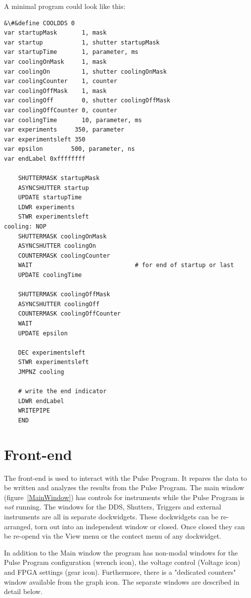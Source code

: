 \documentclass[11pt]{scrartcl}
\begin{document}
A minimal program could look like this:
\begin{lstlisting}
&\#&define COOLDDS 0
var startupMask       1, mask
var startup           1, shutter startupMask
var startupTime       1, parameter, ms
var coolingOnMask     1, mask
var coolingOn         1, shutter coolingOnMask
var coolingCounter    1, counter
var coolingOffMask    1, mask
var coolingOff        0, shutter coolingOffMask
var coolingOffCounter 0, counter
var coolingTime       10, parameter, ms
var experiments     350, parameter
var experimentsleft 350
var epsilon        500, parameter, ns
var endLabel 0xffffffff

	SHUTTERMASK startupMask
	ASYNCSHUTTER startup
	UPDATE startupTime
	LDWR experiments
	STWR experimentsleft
cooling: NOP
	SHUTTERMASK coolingOnMask
	ASYNCSHUTTER coolingOn
	COUNTERMASK coolingCounter
	WAIT                             # for end of startup or last
	UPDATE coolingTime

	SHUTTERMASK coolingOffMask
	ASYNCSHUTTER coolingOff
	COUNTERMASK coolingOffCounter
	WAIT
	UPDATE epsilon

	DEC experimentsleft
	STWR experimentsleft
	JMPNZ cooling	

	# write the end indicator
	LDWR endLabel
	WRITEPIPE	
	END

\end{lstlisting}


\section{Front-end}
The front-end is used to interact with the Pulse Program. It repares the data to be written and analyzes the results from the Pulse Program. The main window (figure~\ref{MainWindow}) has controls for instruments while the Pulse Program is {\em not} running. The windows for the DDS, Shutters, Triggers and external instruments are all in separate dockwidgets. These dockwidgets can be re-arranged, torn out into an independent window or closed. Once closed they can be re-opend via the View menu or the contect menu of any dockwidget.

In addition to the Main window the program has non-modal windows for the Pulse Program configuration (wrench icon), the voltage control (Voltage icon) and FPGA settings (gear icon). Furthermore, there is a "dedicated counters" window available from the graph icon. The separate windows are described in detail below.
\end{document}
